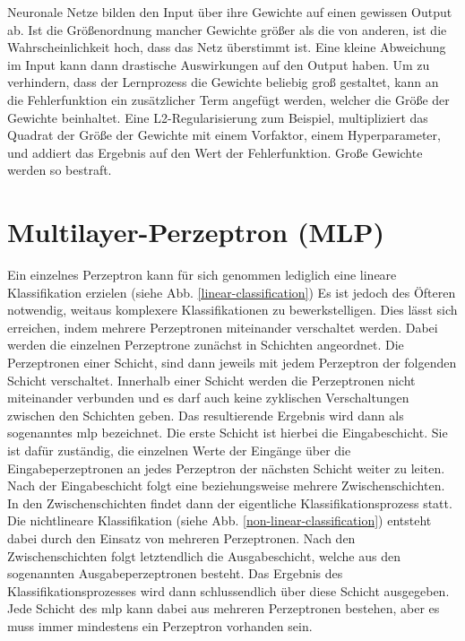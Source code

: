 Neuronale Netze bilden den Input über ihre Gewichte auf einen gewissen Output ab. Ist die Größenordnung mancher Gewichte größer als die von anderen, ist die Wahrscheinlichkeit hoch, dass das Netz überstimmt ist. Eine kleine Abweichung im Input kann dann drastische Auswirkungen auf den Output haben.
Um zu verhindern, dass der Lernprozess die Gewichte beliebig groß gestaltet, kann an die Fehlerfunktion ein zusätzlicher Term angefügt werden, welcher die Größe der Gewichte beinhaltet. Eine L2-Regularisierung zum Beispiel, multipliziert das Quadrat der Größe der Gewichte mit einem Vorfaktor, einem Hyperparameter, und addiert das Ergebnis auf den Wert der Fehlerfunktion. Große Gewichte werden so bestraft.

\section{Multilayer-Perzeptron (MLP)}

Ein einzelnes Perzeptron kann für sich genommen lediglich eine lineare Klassifikation erzielen (siehe Abb. \ref{linear-classification}) Es ist jedoch des Öfteren notwendig, weitaus komplexere Klassifikationen zu bewerkstelligen. Dies lässt sich erreichen, indem mehrere Perzeptronen miteinander verschaltet werden. Dabei werden die einzelnen Perzeptrone zunächst in Schichten angeordnet. Die Perzeptronen einer Schicht, sind dann jeweils mit jedem Perzeptron der folgenden Schicht verschaltet. Innerhalb einer Schicht werden die Perzeptronen nicht miteinander verbunden und es darf auch keine zyklischen Verschaltungen zwischen den Schichten geben. Das resultierende Ergebnis wird dann als sogenanntes \acf{mlp} bezeichnet. Die erste Schicht ist hierbei die Eingabeschicht. Sie ist dafür zuständig, die einzelnen Werte der Eingänge über die Eingabeperzeptronen an jedes Perzeptron der nächsten Schicht weiter zu leiten. Nach der Eingabeschicht folgt eine beziehungsweise mehrere Zwischenschichten. In den Zwischenschichten findet dann der eigentliche Klassifikationsprozess statt. Die nichtlineare Klassifikation (siehe Abb. \ref{non-linear-classification}) entsteht dabei durch den Einsatz von mehreren Perzeptronen. Nach den Zwischenschichten folgt letztendlich die Ausgabeschicht, welche aus den sogenannten Ausgabeperzeptronen besteht. Das Ergebnis des Klassifikationsprozesses wird dann schlussendlich über diese Schicht ausgegeben. Jede Schicht des \acs{mlp} kann dabei aus mehreren Perzeptronen bestehen, aber es muss immer mindestens ein Perzeptron vorhanden sein. \cite{oliver-gableske}

